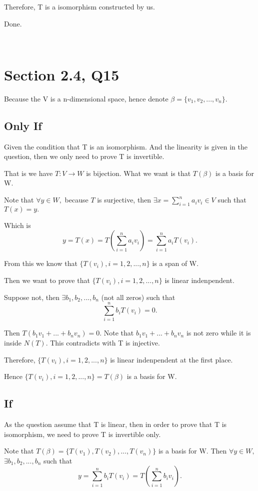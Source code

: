 \documentclass[12pt]{article}%
\begin{document}
Therefore, T is a isomorphism constructed by us. 

Done. 

~\ 

\section{Section 2.4, Q15}

Because the V is a n-dimensional space, hence denote $\beta=\{v_1,v_2,...,v_n\}.$

\subsection{Only If}

Given the condition that T is an isomorphism. And the linearity is given in the question, then we only need to prove T is invertible. 

That is we have $T:V \to W$ is bijection. What we want is that $T(\beta)$ is a basis for W.

Note that $\forall y \in W,$ because $T$ is surjective, then $\exists x=\sum_{i=1}^{n}a_iv_i \in V $ such that $T(x)=y.$ 

Which is $$y=T(x)=T(\sum_{i=1}^{n}a_iv_i)=\sum_{i=1}^{n}a_iT(v_i).$$

From this we know that $\{T(v_i),i=1,2,...,n\}$ is a span of W.

Then we want to prove that $\{T(v_i),i=1,2,...,n\}$ is linear indenpendent.

Suppose not, then $\exists b_1,b_2,...,b_n$ (not all zeros) such that $$\sum_{i=1}^{n}b_iT(v_i)=0.$$

Then $T(b_1v_1+...+b_nv_n)=0.$ Note that $b_1v_1+...+b_nv_n$ is not zero while it is inside $N(T).$ This contradicts with T is injective. 

Therefore, $\{T(v_i),i=1,2,...,n\}$ is linear indenpendent at the first place.

Hence $\{T(v_i),i=1,2,...,n\}=T(\beta)$ is a basis for W.

\subsection{If}

As the question assume that T is linear, then in order to prove that T is isomorphism, we need to prove T is invertible only.

Note that $T(\beta)=\{T(v_1),T(v_2),...,T(v_n)\}$ is a basis for W. Then $\forall y\in W,$ $\exists b_1,b_2,...,b_n$ such that $$y=\sum_{i=1}^{n}b_iT(v_i)=T(\sum_{i=1}^{n}b_iv_i).$$
\end{document}
